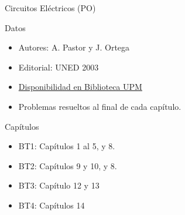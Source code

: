 \documentclass[aspectratio=169, usenames,svgnames,dvipsnames]{beamer}
\begin{document}
\begin{frame}[label={sec:orgc2ffd24}]{Circuitos Eléctricos (\alert{PO})}
\begin{block}{Datos}
\begin{itemize}
\item Autores: A. Pastor y J. Ortega
\item Editorial: UNED 2003
\item \href{https://ingenio.upm.es/primo-explore/fulldisplay?docid=34UPM\_ALMA2148217180004212\&context=L\&vid=34UPM\_VU1\&search\_scope=TAB1\_SCOPE1\&tab=tab1\&lang=es\_ES}{Disponibilidad en Biblioteca UPM}
\item Problemas resueltos al final de cada capítulo.
\end{itemize}
\end{block}

\begin{block}{Capítulos}
\begin{itemize}
\item BT1: Capítulos 1 al 5, y 8.
\item BT2: Capítulos 9 y 10, y 8.
\item BT3: Capítulo 12 y 13
\item BT4: Capítulos 14
\end{itemize}
\end{block}
\end{frame}
\end{document}

